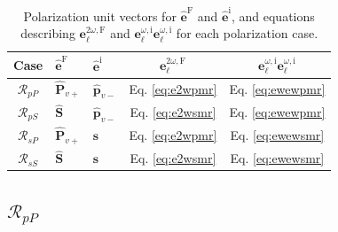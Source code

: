 \begin{table}[b]
\centering
\begin{tabular}{ | c l l c c | }
\hline
Case               & $\hat{\mathbf{e}}^{\mathrm{F}}$
                   & $\hat{\mathbf{e}}^{\mathrm{i}}$
                   & $\mathbf{e}^{2\omega,\mathrm{F}}_{\ell}$
                   & $\mathbf{e}^{\omega,\mathrm{i}}_{\ell}
                      \mathbf{e}^{\omega,\mathrm{i}}_{\ell}$ \\
\hline
$\mathcal{R}_{pP}$ & $\hat{\mathbf{P}}_{v+}$
                   & $\hat{\mathbf{p}}_{v-}$
                   &  Eq. \eqref{eq:e2wpmr} & Eq. \eqref{eq:ewewpmr} \\
$\mathcal{R}_{pS}$ & $\hat{\mathbf{S}}$
                   & $\hat{\mathbf{p}}_{v-}$
                   &  Eq. \eqref{eq:e2wsmr} & Eq. \eqref{eq:ewewpmr} \\
$\mathcal{R}_{sP}$ & $\hat{\mathbf{P}}_{v+}$
                   & $\hat{\mathbf{s}}$
                   &  Eq. \eqref{eq:e2wpmr} & Eq. \eqref{eq:ewewsmr} \\
$\mathcal{R}_{sS}$ & $\hat{\mathbf{S}}$
                   & $\hat{\mathbf{s}}$
                   &  Eq. \eqref{eq:e2wsmr} & Eq. \eqref{eq:ewewsmr} \\
\hline
\end{tabular}
\caption{Polarization unit vectors for $\hat{\mathbf{e}}^{\mathrm{F}}$ and
$\hat{\mathbf{e}}^{\mathrm{i}}$, and equations describing
$\mathbf{e}^{2\omega,\mathrm{F}}_{\ell}$ and
$\mathbf{e}^{\omega,\mathrm{i}}_{\ell}\mathbf{e}^{\omega,\mathrm{i}}_{\ell}$ for
each polarization case.\label{tab:summary}}
\end{table}



\subsection{\texorpdfstring{$\mathcal{R}_{pP}$}{RpP}}\label{sec:RpP} 

